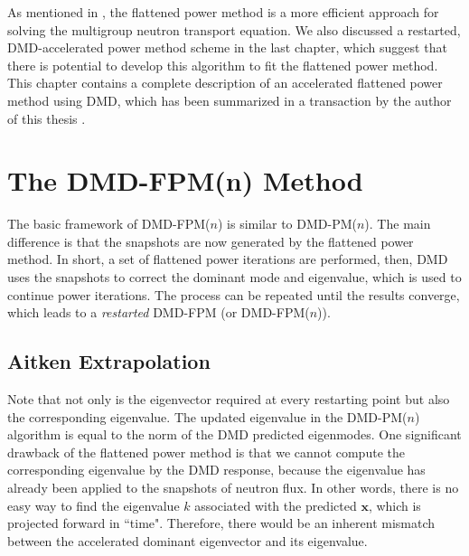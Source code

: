 As mentioned in , the flattened power method is a more efficient approach for solving the multigroup neutron transport equation.
We also discussed a restarted, DMD-accelerated power method scheme in the last chapter, which suggest that there is potential to develop this algorithm to fit the flattened power method.
This chapter contains a complete description of an accelerated flattened power method using DMD, which has been summarized in a transaction by the author of this thesis \cite{xu_acceleration}. 

\section{The DMD-FPM(n) Method}
The basic framework of DMD-FPM($n$) is similar to DMD-PM($n$).
The main difference is that the snapshots are now generated by the flattened power method.
In short, a set of flattened power iterations are performed, then, DMD uses the snapshots to correct the dominant mode and eigenvalue, which is used to continue power iterations.
The process can be repeated until the results converge, which leads to a {\it restarted} DMD-FPM (or DMD-FPM($n$)).

\subsection{Aitken Extrapolation}
Note that not only is the eigenvector required at every restarting point but also the corresponding eigenvalue.
The updated eigenvalue in the DMD-PM($n$) algorithm is equal to the norm of the DMD predicted eigenmodes. 
One significant drawback of the flattened power method is that we cannot compute the corresponding eigenvalue by the DMD response, because the eigenvalue has already been applied to the snapshots of neutron flux.
In other words, there is no easy way to find the eigenvalue $k$ associated with the predicted $\mathbf{x}$, which is projected forward in ``time".
Therefore, there would be an inherent mismatch between the accelerated dominant eigenvector and its eigenvalue.

